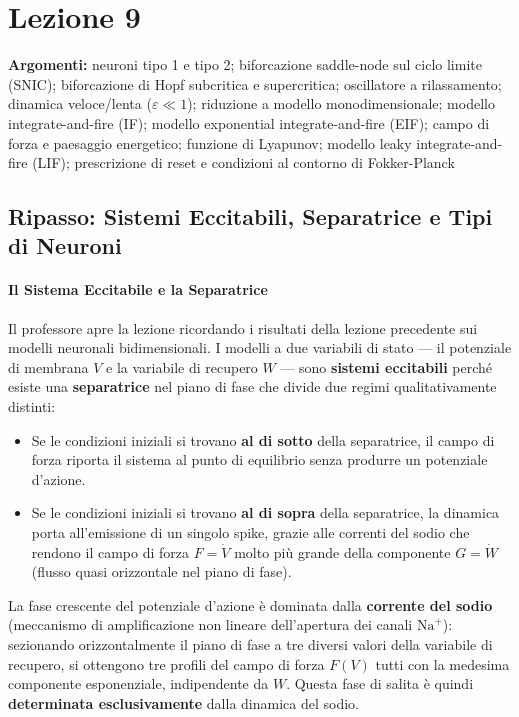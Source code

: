 \chapter{Lezione 9}


\textbf{Argomenti:} neuroni tipo 1 e tipo 2; biforcazione saddle-node sul ciclo limite (SNIC); biforcazione di Hopf subcritica e supercritica; oscillatore a rilassamento; dinamica veloce/lenta ($\varepsilon \ll 1$); riduzione a modello monodimensionale; modello integrate-and-fire (IF); modello exponential integrate-and-fire (EIF); campo di forza e paesaggio energetico; funzione di Lyapunov; modello leaky integrate-and-fire (LIF); prescrizione di reset e condizioni al contorno di Fokker-Planck

\section{Ripasso: Sistemi Eccitabili, Separatrice e Tipi di Neuroni}

\subsubsection{Il Sistema Eccitabile e la Separatrice}

Il professore apre la lezione ricordando i risultati della lezione precedente sui modelli neuronali bidimensionali. I modelli a due variabili di stato — il potenziale di membrana $V$ e la variabile di recupero $W$ — sono \textbf{sistemi eccitabili} perché esiste una \textbf{separatrice} nel piano di fase che divide due regimi qualitativamente distinti:

\begin{itemize}
    \item Se le condizioni iniziali si trovano \textbf{al di sotto} della separatrice, il campo di forza riporta il sistema al punto di equilibrio senza produrre un potenziale d'azione.
    \item Se le condizioni iniziali si trovano \textbf{al di sopra} della separatrice, la dinamica porta all'emissione di un singolo spike, grazie alle correnti del sodio che rendono il campo di forza $F = \dot{V}$ molto più grande della componente $G = \dot{W}$ (flusso quasi orizzontale nel piano di fase).
\end{itemize}

La fase crescente del potenziale d'azione è dominata dalla \textbf{corrente del sodio} (meccanismo di amplificazione non lineare dell'apertura dei canali $\text{Na}^+$): sezionando orizzontalmente il piano di fase a tre diversi valori della variabile di recupero, si ottengono tre profili del campo di forza $F(V)$ tutti con la medesima componente esponenziale, indipendente da $W$. Questa fase di salita è quindi \textbf{determinata esclusivamente} dalla dinamica del sodio.

